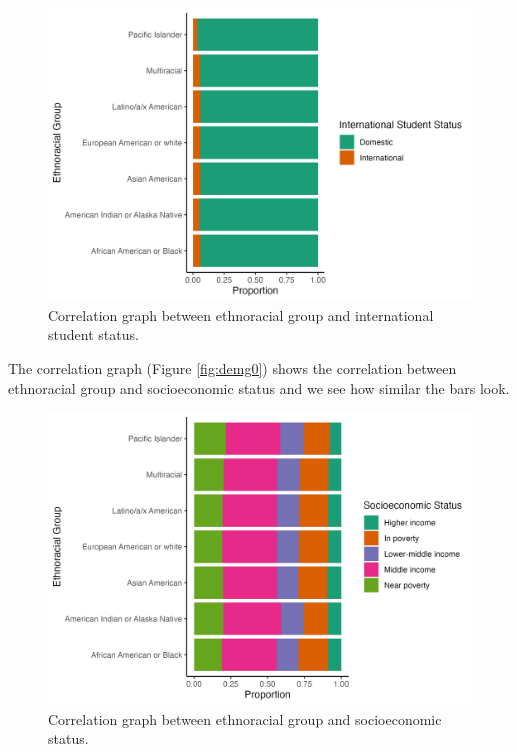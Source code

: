 \documentclass{article}
\begin{document}
\begin{figure}

{\centering \includegraphics[width=0.9\linewidth]{ethnoracial_group_v_international_student_status} 

}

\caption{Correlation graph between ethnoracial group and international student status.}\label{fig:demg1}
\end{figure}

The correlation graph (Figure \ref{fig:demg0}) shows the correlation between ethnoracial group and socioeconomic status and we see how similar the bars look.



\begin{figure}

{\centering \includegraphics[width=0.9\linewidth]{ethnoracial_group_v_socioeconomic_status} 

}

\caption{Correlation graph between ethnoracial group and socioeconomic status.}\label{fig:demg2}
\end{figure}
\end{document}
